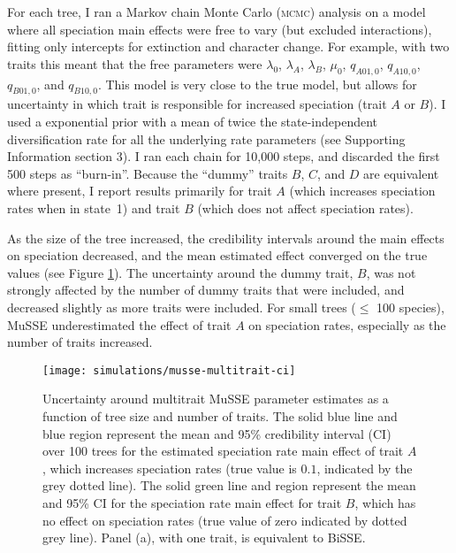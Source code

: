 \documentclass[12pt]{article}
\begin{document}
For each tree, I ran a Markov chain Monte Carlo (\textsc{mcmc})
analysis on a model where all speciation main effects were free to
vary (but excluded interactions), fitting only intercepts for
extinction and character change.  For example, with two traits this
meant that the free parameters were $\lambda_0$, $\lambda_A$,
$\lambda_B$, $\mu_0$, $q_{A01,0}$, $q_{A10,0}$, $q_{B01,0}$, and
$q_{B10,0}$.  This model is very close to the true model, but allows
for uncertainty in which trait is responsible for increased speciation
(trait $A$ or $B$).
%
I used a exponential prior with a mean of twice the state-independent
diversification rate for all the underlying rate parameters (see
Supporting Information section 3).  I ran each chain for 10,000 steps,
and discarded the first 500 steps as ``burn-in''.
%
Because the ``dummy'' traits $B$, $C$, and $D$ are equivalent where
present, I report results primarily for trait $A$ (which increases
speciation rates when in state~1) and trait $B$ (which does not affect
speciation rates).

As the size of the tree increased, the credibility intervals around
the main effects on speciation decreased, and the mean estimated
effect converged on the true values (see Figure \ref{fig:musse-ci}).
The uncertainty around the dummy trait, $B$, was not strongly affected
by the number of dummy traits that were included, and decreased
slightly as more traits were included.
%
For small trees ($\le$ 100 species), MuSSE underestimated the effect
of trait $A$ on speciation rates, especially as the number of traits
increased.


\begin{figure}[p]
  \centering
  \texttt{[image: simulations/musse-multitrait-ci]}
  \caption[Uncertainty around multitrait-MuSSE parameter estimates 
  as a function of tree size and number of traits]{%
    Uncertainty around multitrait MuSSE parameter estimates 
    as a function of tree size and number of traits.
    The solid blue line and blue region represent the mean and 95\%
    credibility interval (CI) over 100 trees for the estimated
    speciation rate main effect of trait $A$, which increases speciation
    rates (true value is
    $0.1$, indicated by the grey dotted line).
    The solid green line and region represent the mean and 95\% CI for
    the speciation rate main effect for trait $B$, which has no
    effect on speciation rates (true value of zero indicated by dotted
    grey line).
    Panel (a), with one trait, is equivalent to BiSSE.
  }
  \label{fig:musse-ci}
\end{figure}
\end{document}
